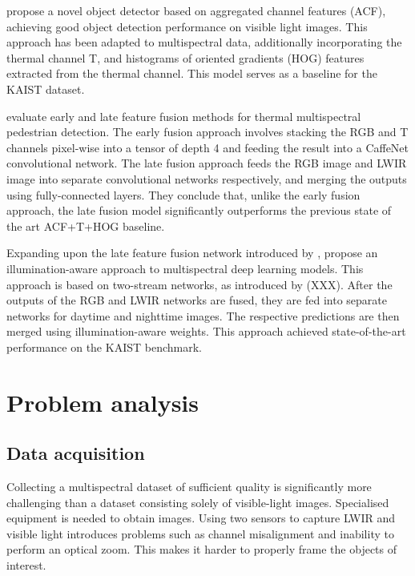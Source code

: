 \documentclass{l4proj}
\begin{document}
\citet{dollar_fast_2014} propose a novel object detector based on aggregated channel features (ACF), achieving good object detection performance on visible light images. This approach has been adapted to multispectral data, additionally incorporating the thermal channel T, and histograms of oriented gradients (HOG) features \citep{dalal_histograms_2005} extracted from the thermal channel. This model serves as a baseline for the KAIST dataset.

\citet{wagner_multispectral_2016} evaluate early and late feature fusion methods for thermal multispectral pedestrian detection. The early fusion approach involves stacking the RGB and T channels pixel-wise into a tensor of depth 4 and feeding the result into a CaffeNet \citep{jia_caffe_2014} convolutional network. The late fusion approach feeds the RGB image and LWIR image into separate convolutional networks respectively, and merging the outputs using fully-connected layers. They conclude that, unlike the early fusion approach, the late fusion model significantly outperforms the previous state of the art ACF+T+HOG baseline.

Expanding upon the late feature fusion network introduced by \citet{wagner_multispectral_2016}, \citet{guan_fusion_2019} propose an illumination-aware approach to multispectral deep learning models. This approach is based on two-stream networks, as introduced by (XXX). After the outputs of the RGB and LWIR networks are fused, they are fed into separate networks for daytime and nighttime images. The respective predictions are then merged using illumination-aware weights. This approach achieved state-of-the-art performance on the KAIST benchmark.


\chapter{Problem analysis}
\label{analysis}

\section{Data acquisition}

Collecting a multispectral dataset of sufficient quality is significantly more challenging than a dataset consisting solely of visible-light images. Specialised equipment is needed to obtain images. Using two sensors to capture LWIR and visible light introduces problems such as channel misalignment and inability to perform an optical zoom. This makes it harder to properly frame the objects of interest.
\end{document}
